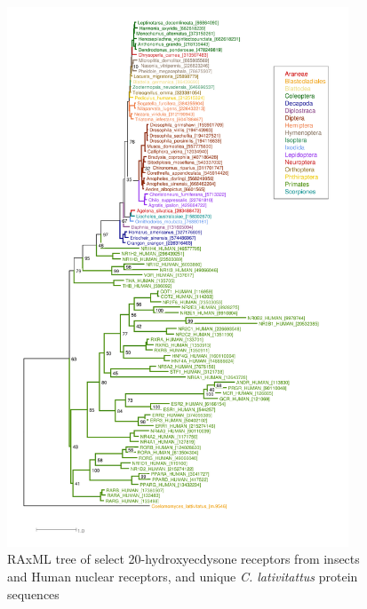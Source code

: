 \begin{figure}[htbp]
  \includegraphics[width=4in]{./Chapter_Coelomomyces/img/20HE_NR_RAxMLTree.png}
  \caption[20HE and Nuclear Receptor RAxML tree]{RAxML tree of select 20-hydroxyecdysone receptors from insects and Human nuclear receptors, and unique \textit{C. lativitattus} protein sequences}
  \label{fig:ChClat_20HE_NRtree}
\end{figure}

